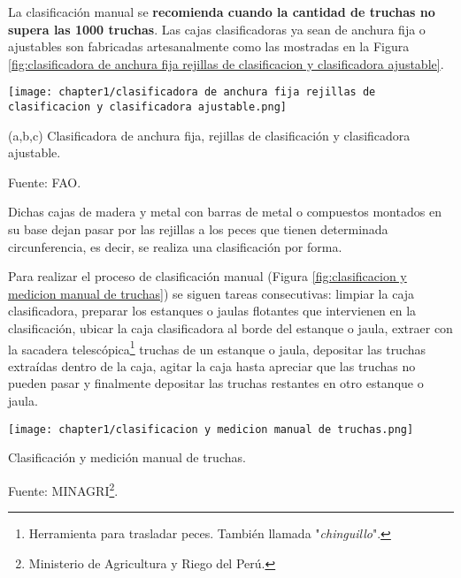 La clasificación manual se \textbf{recomienda cuando la cantidad de truchas no supera las 1000 truchas}.\citep[p.~25]{FAO2014} Las cajas clasificadoras ya sean de anchura fija o ajustables son fabricadas artesanalmente como las mostradas en la Figura \ref{fig:clasificadora de anchura fija rejillas de clasificacion y clasificadora ajustable}.

\begin{myfigure}[H]
	\footnotesize\centering
	\texttt{[image: chapter1/clasificadora de anchura fija rejillas de clasificacion y clasificadora ajustable.png]}
	\caption{(a,b,c) Clasificadora de anchura fija, rejillas de clasificación y clasificadora ajustable.}
	\begin{myflushcenter}
		Fuente: FAO.
	\end{myflushcenter}	
	\label{fig:clasificadora de anchura fija rejillas de clasificacion y clasificadora ajustable}
\end{myfigure}

Dichas cajas de madera y metal con barras de metal o compuestos montados en su base dejan pasar por las rejillas a los peces que tienen determinada circunferencia, es decir, se realiza una clasificación por forma.\citep[p.~15]{FAO2005}

Para realizar el proceso de clasificación manual (Figura \ref{fig:clasificacion y medicion manual de truchas}) se siguen tareas consecutivas: limpiar la caja clasificadora, preparar los estanques o jaulas flotantes que intervienen en la clasificación, ubicar la caja clasificadora al borde del estanque o jaula, extraer con la sacadera telescópica\footnote{Herramienta para trasladar peces. También llamada "\textit{chinguillo}".} truchas de un estanque o jaula, depositar las truchas extraídas dentro de la caja, agitar la caja hasta apreciar que las truchas no pueden pasar y finalmente depositar las truchas restantes en otro estanque o jaula.\\

\begin{savenotes}
	\begin{myfigure}[H]
		\footnotesize\centering
		\texttt{[image: chapter1/clasificacion y medicion manual de truchas.png]}
		\caption{Clasificación y medición manual de truchas.}
		\begin{myflushcenter}
			Fuente: MINAGRI\footnote{Ministerio de Agricultura y Riego del Perú.}.
		\end{myflushcenter}			
		\label{fig:clasificacion y medicion manual de truchas}
	\end{myfigure}
\end{savenotes}

